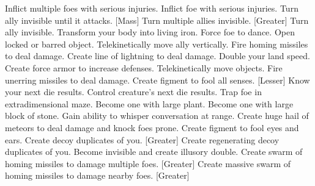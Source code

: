     {Inflict multiple foes with serious injuries.}
    {Inflict foe with serious injuries.}
    {Turn ally invisible until it attacks.}
[Mass]
    {Turn multiple allies invisible.}
[Greater]
    {Turn ally invisible.}
    {Transform your body into living iron.}
    {Force foe to dance.}
    {Open locked or barred object.}
    {Telekinetically move ally vertically.}
    {Fire homing missiles to deal damage.}
    {Create line of lightning to deal damage.}
    {Double your land speed.}
    {Create force armor to increase defenses.}
    {Telekinetically move objects.}
    {Fire unerring missiles to deal damage.}
    {Create figment to fool all senses.}
[Lesser]
    {Know your next die results.}
    {Control creature's next die results.}
    {Trap foe in extradimensional maze.}
    {Become one with large plant.}
    {Become one with large block of stone.}
    {Gain ability to whisper conversation at range.}
    {Create huge hail of meteors to deal damage and knock foes prone.}
    {Create figment to fool eyes and ears.}
    {Create decoy duplicates of you.}
[Greater]
    {Create regenerating decoy duplicates of you.}
    {Become invisible and create illusory double.}
    {Create swarm of homing missiles to damage multiple foes.}
[Greater]
    {Create massive swarm of homing missiles to damage nearby foes.}
[Greater]
